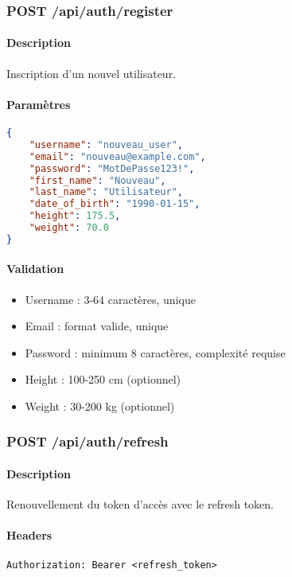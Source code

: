\subsubsection{POST /api/auth/register}

\paragraph{Description}
Inscription d'un nouvel utilisateur.

\paragraph{Paramètres}
\begin{lstlisting}[language=json]
{
    "username": "nouveau_user",
    "email": "nouveau@example.com",
    "password": "MotDePasse123!",
    "first_name": "Nouveau",
    "last_name": "Utilisateur",
    "date_of_birth": "1990-01-15",
    "height": 175.5,
    "weight": 70.0
}
\end{lstlisting}

\paragraph{Validation}
\begin{itemize}
    \item Username : 3-64 caractères, unique
    \item Email : format valide, unique
    \item Password : minimum 8 caractères, complexité requise
    \item Height : 100-250 cm (optionnel)
    \item Weight : 30-200 kg (optionnel)
\end{itemize}

\subsubsection{POST /api/auth/refresh}

\paragraph{Description}
Renouvellement du token d'accès avec le refresh token.

\paragraph{Headers}
\begin{lstlisting}[language=http]
Authorization: Bearer <refresh_token>
\end{lstlisting}

